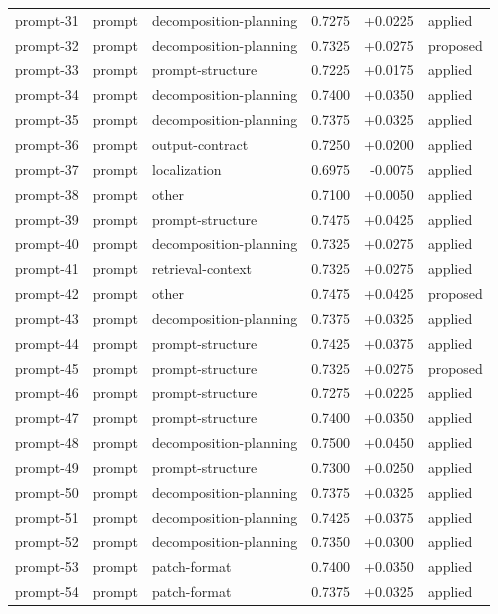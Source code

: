 \begin{center}
\begin{longtable}{llp{5.2cm}rrl}
prompt-31 & prompt & decomposition-planning & 0.7275 & +0.0225 & applied \\
prompt-32 & prompt & decomposition-planning & 0.7325 & +0.0275 & proposed \\
prompt-33 & prompt & prompt-structure & 0.7225 & +0.0175 & applied \\
prompt-34 & prompt & decomposition-planning & 0.7400 & +0.0350 & applied \\
prompt-35 & prompt & decomposition-planning & 0.7375 & +0.0325 & applied \\
prompt-36 & prompt & output-contract & 0.7250 & +0.0200 & applied \\
prompt-37 & prompt & localization & 0.6975 & -0.0075 & applied \\
prompt-38 & prompt & other & 0.7100 & +0.0050 & applied \\
prompt-39 & prompt & prompt-structure & 0.7475 & +0.0425 & applied \\
prompt-40 & prompt & decomposition-planning & 0.7325 & +0.0275 & applied \\
prompt-41 & prompt & retrieval-context & 0.7325 & +0.0275 & applied \\
prompt-42 & prompt & other & 0.7475 & +0.0425 & proposed \\
prompt-43 & prompt & decomposition-planning & 0.7375 & +0.0325 & applied \\
prompt-44 & prompt & prompt-structure & 0.7425 & +0.0375 & applied \\
prompt-45 & prompt & prompt-structure & 0.7325 & +0.0275 & proposed \\
prompt-46 & prompt & prompt-structure & 0.7275 & +0.0225 & applied \\
prompt-47 & prompt & prompt-structure & 0.7400 & +0.0350 & applied \\
prompt-48 & prompt & decomposition-planning & 0.7500 & +0.0450 & applied \\
prompt-49 & prompt & prompt-structure & 0.7300 & +0.0250 & applied \\
prompt-50 & prompt & decomposition-planning & 0.7375 & +0.0325 & applied \\
prompt-51 & prompt & decomposition-planning & 0.7425 & +0.0375 & applied \\
prompt-52 & prompt & decomposition-planning & 0.7350 & +0.0300 & applied \\
prompt-53 & prompt & patch-format & 0.7400 & +0.0350 & applied \\
prompt-54 & prompt & patch-format & 0.7375 & +0.0325 & applied \\

\end{longtable}
\end{center}
